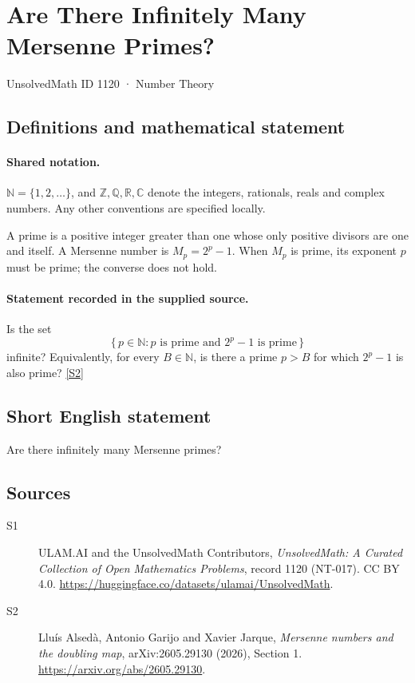 \documentclass[11pt]{article}
\newcommand{\sref}[2]{\hyperlink{source:#1:#2}{[S#2]}}
\begin{document}
\setcounter{section}{1119}
\section{Are There Infinitely Many Mersenne Primes?}\label{1120}
{\small\sffamily UnsolvedMath ID 1120 · Number Theory}
\subsection{Definitions and mathematical statement}

\paragraph{Shared notation.}$\mathbb N=\{1,2,\ldots\}$, and $\mathbb Z,\mathbb Q,\mathbb R,\mathbb C$ denote the integers, rationals, reals and complex numbers. Any other conventions are specified locally.


A prime is a positive integer greater than one whose only positive
divisors are one and itself.  A Mersenne number is \(M_p=2^p-1\).
When \(M_p\) is prime, its exponent \(p\) must be prime; the converse
does not hold.
\paragraph{Statement recorded in the supplied source.}
Is the set
\[
 \{\,p\in\mathbb N:p\text{ is prime and }2^p-1\text{ is prime}\,\}
\]
infinite?  Equivalently, for every \(B\in\mathbb N\), is there a prime
\(p>B\) for which \(2^p-1\) is also prime? \sref{1120}{2}
\subsection{Short English statement}
Are there infinitely many Mersenne primes?
\subsection{Sources}
\begin{description}
\item[\hypertarget{source:1120:1}{S1}] ULAM.AI and the UnsolvedMath Contributors, \emph{UnsolvedMath: A Curated Collection of Open Mathematics Problems}, record 1120 (NT-017). CC BY 4.0. \url{https://huggingface.co/datasets/ulamai/UnsolvedMath}.
\item[\hypertarget{source:1120:2}{S2}] Llu\'is Alsed\`a, Antonio Garijo and Xavier Jarque, \emph{Mersenne numbers and the doubling map}, arXiv:2605.29130 (2026), Section 1. \url{https://arxiv.org/abs/2605.29130}.
\end{description}
\label{end:1120}
\end{document}
